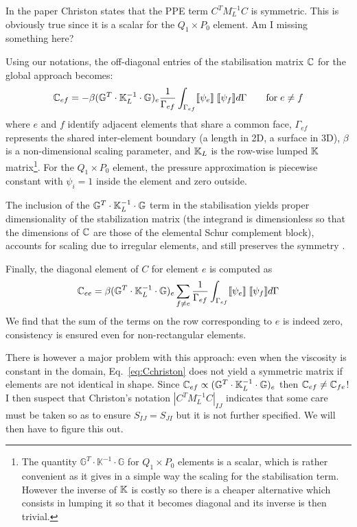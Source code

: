 In the paper Christon states that the PPE term $C^TM_L^{-1}C$
is symmetric. This is obviously true since it is a scalar for the $Q_1\times P_0$ element. Am I missing something here?

Using our notations, the off-diagonal entries of the stabilisation matrix ${\mathbb{C}}$ for the global approach  becomes:
\begin{equation}
{\mathbb{C}}_{ef} = -\beta ({\mathbb{G}}^T\cdot {\mathbb{K}}_L^{-1} \cdot {\mathbb{G}})_{e} 
\frac{1}{\Gamma_{ef}} \int_{\Gamma_{ef}} \llbracket \psi_e \rrbracket \; \llbracket \psi_f \rrbracket d\Gamma
\qquad
\text{for} \; e\ne f
\label{eq:Cchriston}
\end{equation}
where $e$ and $f$ identify adjacent elements that share a common face, $\Gamma_{ef}$ represents the shared inter-element boundary (a length in 2D, a surface in 3D),  $\beta$ is a non-dimensional scaling parameter, and ${\mathbb{K}}_L$ is the row-wise lumped ${\mathbb{K}}$ matrix\footnote{
The quantity $\mathbb{G}^T \cdot \mathbb{K}^{-1} \cdot \mathbb{G}$ for $Q_1\times P_0$ elements is a scalar,
which is rather convenient as it gives in a simple way the scaling for the stabilisation term. However the inverse of ${\mathbb{K}}$ is costly so there is a cheaper alternative which consists in lumping it so that it becomes diagonal and its inverse is then trivial.}.
For the $Q_1\times P_0$ element, the pressure approximation is piecewise constant with $\psi_i=1$ inside the element and zero outside.

The inclusion of the ${\mathbb{G}}^T\cdot {\mathbb{K}}_L^{-1} \cdot {\mathbb{G}}$
term  in the stabilisation yields proper dimensionality of the stabilization matrix (the integrand is dimensionless so that the dimensions of ${\mathbb{C}}$ are those of the elemental Schur complement block), accounts for scaling due to irregular elements, and still preserves the symmetry \cite{chri02}.


Finally, the diagonal element of $C$ for element $e$ is computed as 
\[
{\mathbb{C}}_{ee} =  \beta ({\mathbb{G}}^T\cdot {\mathbb{K}}_L^{-1} \cdot {\mathbb{G}})_{e} 
\sum_{f\ne e} \frac{1}{\Gamma_{ef}} \int_{\Gamma_{ef}} \llbracket \psi_e \rrbracket \; \llbracket \psi_f \rrbracket d\Gamma
\]
We find that the sum of the terms on the row corresponding to $e$ is indeed zero, consistency is ensured even for non-rectangular elements.

There is however a major problem with this approach: even when the viscosity is constant in the domain, Eq.~\eqref{eq:Cchriston} does not yield a symmetric matrix if elements are not identical in shape. 
Since ${\mathbb{C}}_{ef} \propto ({\mathbb{G}}^T\cdot {\mathbb{K}}_L^{-1} \cdot {\mathbb{G}})_{e}$
then ${\mathbb{C}}_{ef} \neq {\mathbb{C}}_{fe}$!
I then suspect that Christon's notation $|C^TM_L^{-1}C|_{IJ}$
indicates that some care must be taken so as to ensure $S_{IJ}=S_{JI}$ but it is not further specified.
We will then have to figure this out. 

